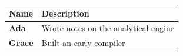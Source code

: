 \documentclass{article}
\begin{document}
\begin{tabular}{>{\bfseries}l m{5cm}}
Name & Description \\
\hline
Ada & Wrote notes on the analytical engine \\
Grace & Built an early compiler \\
\end{tabular}
\end{document}
